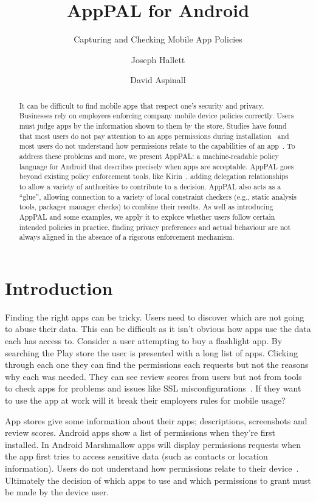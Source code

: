 \documentclass[]{llncs}
\title{AppPAL for Android}
\subtitle{Capturing and Checking Mobile App Policies}
\author{Joseph Hallett \and David Aspinall }
\institute{School of Informatics, University of Edinburgh}
\begin{document}
\maketitle{}

\begin{abstract}
  It can be difficult to find mobile apps that respect one's security and privacy.
  Businesses rely on employees enforcing company mobile device policies correctly.
  Users must judge apps by the information shown to them by the store.
  Studies have found that most users do not pay attention to an apps permissions during installation~\cite{Felt:2012hm} and most users do not understand how permissions relate to the capabilities of an app~\cite{Kelley:2012bw}.
  To address these problems and more, we present AppPAL: a machine-readable policy language for Android that describes precisely when apps are acceptable.
  AppPAL goes beyond existing policy enforcement tools, like Kirin~\cite{Enck:2009ko}, adding delegation relationships to allow a variety of authorities to contribute to a decision.
  AppPAL also acts as a ``glue'', allowing connection to a variety of local constraint checkers (e.g., static analysis tools, packager manager checks) to combine their results.
  As well as introducing AppPAL and some examples, we apply it to explore whether users follow certain intended policies in practice, finding privacy preferences and actual behaviour are not always aligned in the absence of a rigorous enforcement mechanism.
  \end{abstract}

\section{Introduction}
\label{sec:introduction}

Finding the right apps can be tricky.
Users need to discover which are not going to abuse their data.
This can be difficult as it isn't obvious how apps use the data each has access to.
Consider a user attempting to buy a flashlight app.
By searching the Play store the user is presented with a long list of apps.
Clicking through each one they can find the permissions each requests but not the reasons why each was needed.
They can see review scores from users but not from tools to check apps for problems and issues like SSL misconfigurations~\cite{Fahl:2012dj}.
If they want to use the app at work will it break their employers rules for mobile usage?

App stores give some information about their apps; descriptions, screenshots and review scores.
Android apps show a list of permissions when they're first installed.
In Android Marshmallow apps will display permissions requests when the app first tries to access sensitive data (such as contacts or location information).
Users do not understand how permissions relate to their device~\cite{Felt:2012hm,Thompson:2013eb}.
Ultimately the decision of which apps to use and which permissions to grant must be made by the device user.
\end{document}
